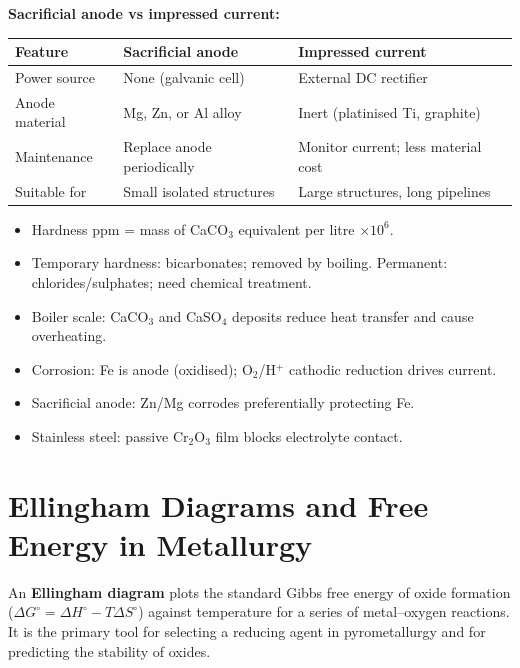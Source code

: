 \documentclass[12pt,a4paper]{article}
\begin{document}
\textbf{Sacrificial anode vs impressed current:}\par\noindent
\begin{tabularx}{\linewidth}{|B{3.0cm}|Y|Y|}
\hline
\textbf{Feature} & \textbf{Sacrificial anode} & \textbf{Impressed current} \\
\hline
Power source & None (galvanic cell) & External DC rectifier \\
\hline
Anode material & Mg, Zn, or Al alloy & Inert (platinised Ti, graphite) \\
\hline
Maintenance & Replace anode periodically & Monitor current; less material cost \\
\hline
Suitable for & Small isolated structures & Large structures, long pipelines \\
\hline
\end{tabularx}

\begin{tcolorbox}[exambox, title={Exam Points (Section 6)}]
\begin{itemize}[leftmargin=*, itemsep=2pt, topsep=2pt]
  \item Hardness ppm = mass of CaCO$_3$ equivalent per litre $\times 10^6$.
  \item Temporary hardness: bicarbonates; removed by boiling. Permanent: chlorides/sulphates; need chemical treatment.
  \item Boiler scale: CaCO$_3$ and CaSO$_4$ deposits reduce heat transfer and cause overheating.
  \item Corrosion: Fe is anode (oxidised); O$_2$/H$^+$ cathodic reduction drives current.
  \item Sacrificial anode: Zn/Mg corrodes preferentially protecting Fe.
  \item Stainless steel: passive Cr$_2$O$_3$ film blocks electrolyte contact.
\end{itemize}
\end{tcolorbox}

\section{Ellingham Diagrams and Free Energy in Metallurgy}

\begin{tcolorbox}[defbox]
An \textbf{Ellingham diagram} plots the standard Gibbs free energy of oxide formation ($\Delta G^\circ = \Delta H^\circ - T\Delta S^\circ$) against temperature for a series of metal--oxygen reactions. It is the primary tool for selecting a reducing agent in pyrometallurgy and for predicting the stability of oxides.
\end{tcolorbox}
\end{document}
